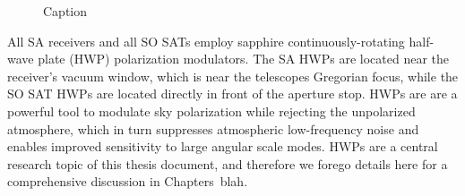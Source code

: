 \begin{figure}
    \centering
    \hfill
    \caption{Caption}
    \label{fig:so_telescope}
\end{figure}

All SA receivers and all SO SATs employ sapphire continuously-rotating half-wave plate (HWP) polarization modulators. The SA HWPs are located near the receiver's vacuum window, which is near the telescopes Gregorian focus, while the SO SAT HWPs are located directly in front of the aperture stop. HWPs are are a powerful tool to modulate sky polarization while rejecting the unpolarized atmosphere, which in turn suppresses atmospheric low-frequency noise and enables improved sensitivity to large angular scale modes. HWPs are a central research topic of this thesis document, and therefore we forego details here for a comprehensive discussion in Chapters~blah.

